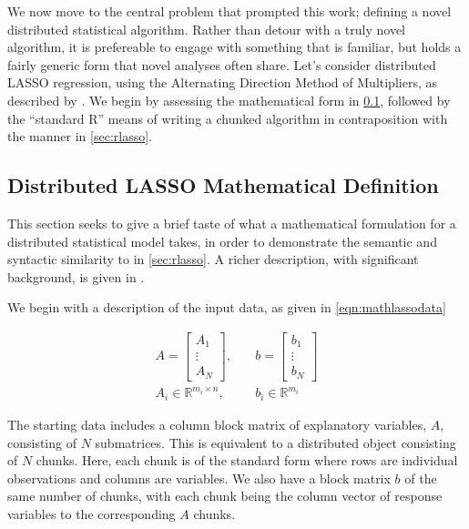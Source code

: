 We now move to the central problem that prompted this work; defining a novel distributed statistical algorithm.
Rather than detour with a truly novel algorithm, it is prefereable to engage with something that is familiar, but holds a fairly generic form that novel analyses often share.
Let's consider distributed LASSO regression, using the Alternating Direction Method of Multipliers, as described by \textcite{mateos2010}.
We begin by assessing the mathematical form in \cref{sec:mathlasso}, followed by the ``standard R'' means of writing a chunked algorithm in contraposition with the  manner in \cref{sec:rlasso}.

\subsection{Distributed LASSO Mathematical Definition}\label{sec:mathlasso}

This section seeks to give a brief taste of what a mathematical formulation for a distributed statistical model takes, in order to demonstrate the semantic and syntactic similarity to  in \cref{sec:rlasso}.
A richer description, with significant background, is given in \textcite{boyd2011}.

We begin with a description of the input data, as given in \cref{eqn:mathlassodata}

\begin{equation}
\begin{aligned}\label{eqn:mathlassodata}
    A = \begin{bmatrix}
        A_1\\
        \vdots \\
        A_N
    \end{bmatrix},&
    \quad b=\begin{bmatrix}
        b_1\\
        \vdots \\
        b_N
    \end{bmatrix}\\
    A_i \in \mathbb{R}^{m_i\times n},& \quad b_i \in \mathbb{R}^{m_i}
\end{aligned}
\end{equation}

The starting data includes a column block matrix of explanatory variables, $A$, consisting of $N$ submatrices.
This is equivalent to a distributed object consisting of $N$ chunks.
Here, each chunk is of the standard form where rows are individual observations and columns are variables.
We also have a block matrix $b$ of the same number of chunks, with each chunk being the column vector of response variables to the corresponding $A$ chunks.

